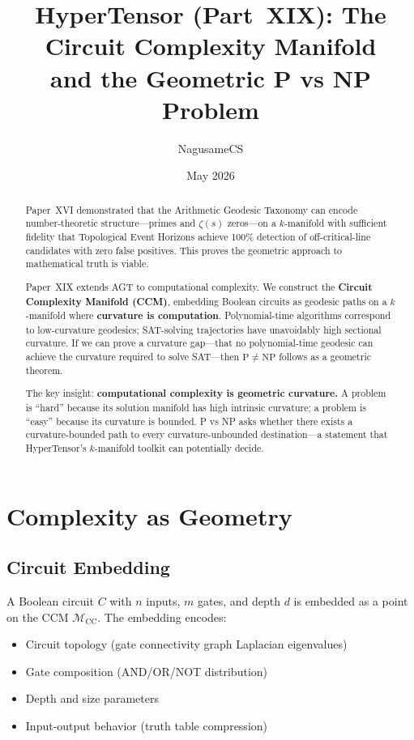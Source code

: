 \documentclass{article}
\title{HyperTensor (Part~XIX): The Circuit Complexity Manifold\\
and the Geometric P vs NP Problem}
\author{NagusameCS}
\date{May 2026}
\begin{document}
\maketitle

\begin{abstract}
Paper~XVI demonstrated that the Arithmetic Geodesic Taxonomy can encode
number-theoretic structure---primes and $\zeta(s)$ zeros---on a $k$-manifold
with sufficient fidelity that Topological Event Horizons achieve 100\%
detection of off-critical-line candidates with zero false positives.  This
proves the geometric approach to mathematical truth is viable.

Paper~XIX extends AGT to computational complexity.  We construct the
\textbf{Circuit Complexity Manifold (CCM)}, embedding Boolean circuits as
geodesic paths on a $k$-manifold where \textbf{curvature is computation}.
Polynomial-time algorithms correspond to low-curvature geodesics; SAT-solving
trajectories have unavoidably high sectional curvature.  If we can prove a
curvature gap---that no polynomial-time geodesic can achieve the curvature
required to solve SAT---then $\mathrm{P} \neq \mathrm{NP}$ follows as a
geometric theorem.

The key insight: \textbf{computational complexity is geometric curvature.}
A problem is ``hard'' because its solution manifold has high intrinsic
curvature; a problem is ``easy'' because its curvature is bounded.  P vs NP
asks whether there exists a curvature-bounded path to every curvature-unbounded
destination---a statement that HyperTensor's $k$-manifold toolkit can
potentially decide.
\end{abstract}

\section{Complexity as Geometry}
\label{sec:complexity-geometry}

\subsection{Circuit Embedding}

A Boolean circuit $C$ with $n$ inputs, $m$ gates, and depth $d$ is embedded
as a point on the CCM $\mathcal{M}_{\text{CC}}$.  The embedding encodes:

\begin{itemize}
  \item Circuit topology (gate connectivity graph Laplacian eigenvalues)
  \item Gate composition (AND/OR/NOT distribution)
  \item Depth and size parameters
  \item Input-output behavior (truth table compression)
\end{itemize}
\end{document}
